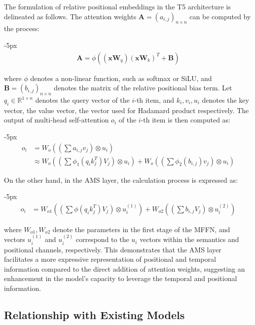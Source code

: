  The formulation of relative positional embeddings in the T5 architecture \cite{raffel2020t5} is delineated as follows.
The attention weights $\mathbf A = (a_{i, j})_{n\times n}$ can be computed by the process:
\begin{shrinkeq}{-5px}
    \begin{align}
        \mathbf A = \phi\left((\mathbf x \mathbf{W}_q)(\mathbf x \mathbf W_k)^T + \mathbf{B}\right)
    \end{align}
\end{shrinkeq}
where $\phi$ denotes a non-linear function, such as softmax or SiLU, and $\mathbf B = (b_{i, j})_{n\times n}$ denotes the matrix of the relative positional bias term. Let $q_i \in \mathbb R^{1 \times n}$ denotes the query vector of the $i$-th item, and $k_i, v_i, u_i$ denotes the key vector, the value vector, the vector used for Hadamard product respectively. 
The output of multi-head self-attention $o_i$ of the $i$-th item is then computed as:
\begin{shrinkeq}{-5px}
\begin{align}
    o_i &= W_o\left (\left (\sum a_{i,j} v_j \right)\otimes u_i \right) \\
    &\approx W_o \left (\left (\sum \phi_1(q_i k_j^T) V_j \right) \otimes u_i\right) +  W_o \left (\left (\sum \phi_2(b_{i,j}) v_j \right) \otimes u_i \right)
\end{align}
\end{shrinkeq}

On the other hand, in the AMS layer, the calculation process
is expressed as:
\begin{shrinkeq}{-5px}
\begin{align}
    o_i &= W_{o1}\left (\left (\sum \phi(q_i k_j^T) V_j \right) \otimes u_{i}^{(1)}\right) +  W_{o2} \left (\left(\sum b_{i,j} V_j \right) \otimes u_{i}^{(2)} \right)
\end{align}
\end{shrinkeq}
where $W_{o1}, W_{o2}$ denote the parameters in the first stage of the MFFN, and vectors $u_{i}^{(1)}$ and $u_{i}^{(2)}$ correspond to the $u_i$ vectors within the semantics and positional channels, respectively.
This demonstrates that the AMS layer facilitates a more expressive representation of positional and temporal information compared to the direct addition of attention weights, suggesting an enhancement in the model's capacity to leverage the temporal and positional information.

\subsection{Relationship with Existing Models}

